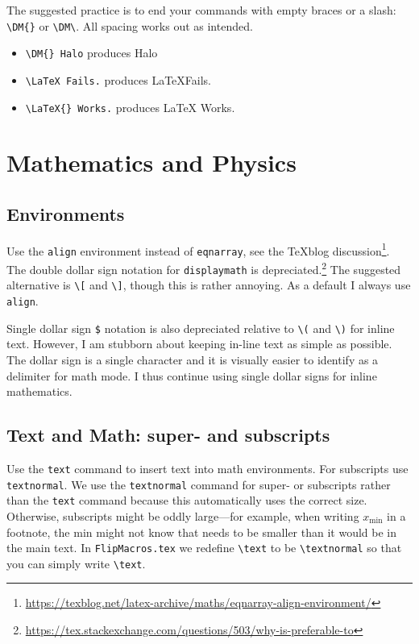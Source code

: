 The suggested practice is to end your commands with empty braces or a slash: \verb!\DM{}! or \verb!\DM\!. All spacing works out as intended. 
\begin{itemize}
	\item \verb!\DM{} Halo! produces \DM{} Halo
	\item \verb!\LaTeX Fails.! produces \LaTeX Fails.
	\item \verb!\LaTeX{} Works.! produces \LaTeX{} Works.
\end{itemize}






\section{Mathematics and Physics}

\subsection{Environments}

Use the \texttt{align} environment instead of \texttt{eqnarray}, see the TeXblog discussion\footnote{\url{https://texblog.net/latex-archive/maths/eqnarray-align-environment/}}. The double dollar sign notation for \texttt{displaymath} is depreciated.\footnote{\url{https://tex.stackexchange.com/questions/503/why-is-preferable-to}} The suggested alternative is \verb!\[! and \verb!\]!, though this is rather annoying. As a default I always use \texttt{align}.

Single dollar sign \verb!$! notation is also depreciated relative to \verb!\(! and \verb!\)! for inline text. However, I am stubborn about keeping in-line text as simple as possible. The dollar sign is a single character and it is visually easier to identify as a delimiter for math mode. I thus continue using single dollar signs for inline mathematics. 


\subsection{Text and Math: super- and subscripts}

Use the \texttt{text} command to insert text into math environments. For subscripts use \texttt{textnormal}. 
% 
We use the \texttt{textnormal} command for super- or subscripts rather than the \texttt{text} command because this automatically uses the correct size. Otherwise, subscripts might be oddly large---for example, when writing $x_\text{min}$ in a footnote, the $\text{min}$ might not know that needs to be smaller than it would be in the main text. In \texttt{FlipMacros.tex} we redefine \verb!\text! to be \verb!\textnormal! so that you can simply write \verb!\text!.

